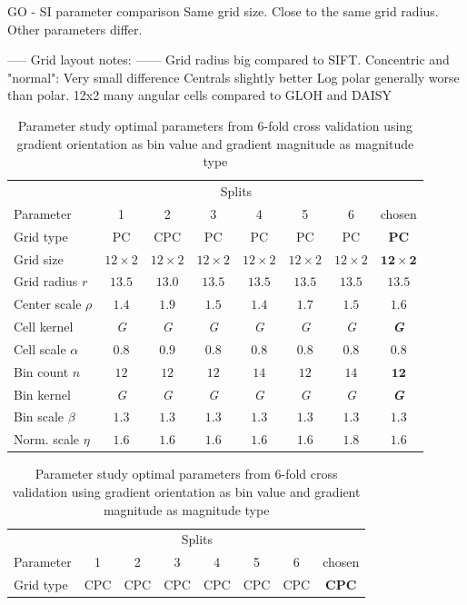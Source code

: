 \documentclass[thesis.tex]{subfiles}
\begin{document}
GO - SI parameter comparison
Same grid size. Close to the same grid radius. Other parameters differ.

-----
Grid layout notes:
------
Grid radius big compared to SIFT.
Concentric and "normal": Very small difference
Centrals slightly better
Log polar generally worse than polar.
12x2 many angular cells compared to GLOH and DAISY
%
\begin{table}[p]
\centering
\begin{tabular}{ l c c c c c c c}
\toprule
{} & \multicolumn{6}{c}{Splits} \\
Parameter & 1 & 2 & 3 & 4 & 5 & 6 & chosen \\ \midrule
Grid type & PC & CPC & PC & PC & PC & PC & \textbf{PC} \\
Grid size & $12 \times 2$ & $12 \times 2$ & $12 \times 2$ & $12 \times 2$ & $12 \times 2$ & $12 \times 2$ & \textbf{$\mathbf{12 \times 2}$} \\
Grid radius $r$ & $13.5$ & $13.0$ & $13.5$ & $13.5$ & $13.5$ & $13.5$ & $\mathbf{13.5}$ \\
Center scale $\rho$ & $1.4$ & $1.9$ & $1.5$ & $1.4$ & $1.7$ & $1.5$ & $\mathbf{1.6}$ \\
Cell kernel & \textit{G} & \textit{G} & \textit{G} & \textit{G} & \textit{G} & \textit{G} & \textbf{\textit{G}} \\
Cell scale $\alpha$ & $0.8$ & $0.9$ & $0.8$ & $0.8$ & $0.8$ & $0.8$ & $\mathbf{0.8}$ \\
Bin count $n$ & $12$ & $12$ & $12$ & $14$ & $12$ & $14$ & $\mathbf{12}$ \\
Bin kernel & \textit{G} & \textit{G} & \textit{G} & \textit{G} & \textit{G} & \textit{G} & \textbf{\textit{G}} \\
Bin scale $\beta$ & $1.3$ & $1.3$ & $1.3$ & $1.3$ & $1.3$ & $1.3$ & $\mathbf{1.3}$ \\
Norm. scale $\eta$ & $1.6$ & $1.6$ & $1.6$ & $1.6$ & $1.6$ & $1.8$ & $\mathbf{1.6}$ \\
\bottomrule
\end{tabular}
\caption{Parameter study optimal parameters from 6-fold cross validation using gradient orientation as bin value and gradient magnitude as magnitude type}
\label{fig:ICparamsGo}
%
\vspace{1cm}
%
\begin{tabular}{ l c c c c c c c}
\toprule
{} & \multicolumn{6}{c}{Splits} \\
Parameter & 1 & 2 & 3 & 4 & 5 & 6 & chosen \\ \midrule
Grid type & CPC & CPC & CPC & CPC & CPC & CPC & \textbf{CPC} \\

\end{tabular}
\end{table}
\end{document}
